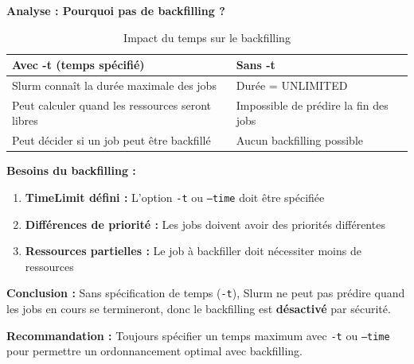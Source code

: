 \documentclass[12pt,a4paper]{article}
\newcommand{\code}[1]{\texttt{#1}}
\begin{document}
\textbf{Analyse : Pourquoi pas de backfilling ?}

\begin{table}[h]
\centering
\begin{tabular}{|p{6cm}|p{6cm}|}
\hline
\textbf{Avec -t (temps spécifié)} & \textbf{Sans -t} \\
\hline
Slurm connaît la durée maximale des jobs & Durée = UNLIMITED \\
Peut calculer quand les ressources seront libres & Impossible de prédire la fin des jobs \\
Peut décider si un job peut être backfillé & Aucun backfilling possible \\
\hline
\end{tabular}
\caption{Impact du temps sur le backfilling}
\end{table}

\textbf{Besoins du backfilling :}
\begin{enumerate}
    \item \textbf{TimeLimit défini :} L'option \code{-t} ou \code{--time} doit être spécifiée
    \item \textbf{Différences de priorité :} Les jobs doivent avoir des priorités différentes
    \item \textbf{Ressources partielles :} Le job à backfiller doit nécessiter moins de ressources
\end{enumerate}

\textbf{Conclusion :} Sans spécification de temps (\code{-t}), Slurm ne peut pas prédire quand les jobs en cours se termineront, donc le backfilling est \textbf{désactivé} par sécurité.

\textbf{Recommandation :} Toujours spécifier un temps maximum avec \code{-t} ou \code{--time} pour permettre un ordonnancement optimal avec backfilling.
\end{document}
